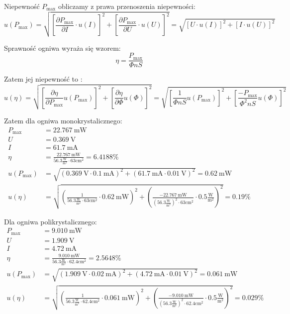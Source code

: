 \documentclass{fizykalab}
\newcommand{\volt}{\ensuremath{\:\text{V}}}
\newcommand{\mampr}{\ensuremath{\:\text{mA}}}
\newcommand{\mwat}{\ensuremath{\:\text{mW}}}
\newcommand{\phiJ}{\ensuremath{\frac{\text{W}}{\text{m}^2} }}
\begin{document}
Niepewność $P_\text{max}$  obliczamy z prawa przenoszenia niepewności:
\begin{equation*}
    u(P_\text{max}) = \sqrt{
    \left[ \frac{\partial P_\text{max}}{\partial I} \cdot u(I) \right]^2 + 
    \left[ \frac{\partial P_\text{max}}{\partial U} \cdot u(U) \right]^2
    } = \sqrt{
    \left[ U \cdot u(I) \right]^2 + 
    \left[ I \cdot u(U) \right]^2
    }
\end{equation*}

Sprawność ogniwa wyraża się wzorem:
\begin{equation*}
    \eta = \frac{P_\text{max}}{\Phi n S}
\end{equation*}

Zatem jej niepewność to :
\begin{equation*}
    u(\eta) = \sqrt {
        \left[ \frac{\partial \eta}{\partial P_\text{max}} u(P_\text{max}) \right]^2 +
        \left[ \frac{\partial \eta}{\partial \Phi} u(\Phi) \right]^2
    } = \sqrt {
        \left[ \frac{1}{\Phi n S} u(P_\text{max}) \right]^2 +
        \left[ \frac{-P_\text{max}}{\Phi^2 nS} u(\Phi) \right]^2
    } 
\end{equation*}

Zatem dla ogniwa monokrystalicznego:
\begin{align*}
    P_\text{max} &= 22.767 \mwat \\
    U &= 0.369 \volt \\
    I &= 61.7 \mampr \\
    \eta &= \frac{22.767 \mwat}{56.3 \phiJ \cdot 63 \text{cm}^2} = 6.4188 \% \\
    u(P_\text{max}) &=  \sqrt{
    \left( 0.369 \volt \cdot 0.1 \mampr \right)^2 + 
    \left( 61.7 \mampr \cdot 0.01 \volt \right)^2
    } = 0.62 \mwat  \\
    u(\eta) &= \sqrt {
        \left( \frac{1}{56.3 \phiJ \cdot 63 \text{cm}^2 } \cdot 0.62 \mwat \right)^2 +
        \left( \frac{-22.767 \mwat}{ \left(56.3 \phiJ\right)^2 \cdot 63 \text{cm}^2}
        \cdot 0.5 \phiJ \right)^2
    } = 0.19 \%
\end{align*}


Dla ogniwa polikrystalicznego:
\begin{align*}
    P_\text{max} &= 9.010 \mwat \\
    U &= 1.909 \volt \\
    I &= 4.72 \mampr \\
    \eta &= \frac{9.010 \mwat}{56.3 \phiJ \cdot 62.4 \text{cm}^2} = 2.5648 \% \\
    u(P_\text{max}) &=  \sqrt{
    \left( 1.909 \volt \cdot 0.02 \mampr \right)^2 + 
    \left( 4.72 \mampr \cdot 0.01 \volt \right)^2
    } = 0.061 \mwat  \\
    u(\eta) &= \sqrt {
        \left( \frac{1}{56.3 \phiJ \cdot 62.4 \text{cm}^2 } \cdot 0.061 \mwat \right)^2 +
        \left( \frac{-9.010 \mwat}{ \left(56.3 \phiJ\right)^2 \cdot 62.4 \text{cm}^2}
        \cdot 0.5 \phiJ \right)^2
    } = 0.029 \%
\end{align*}
\end{document}
